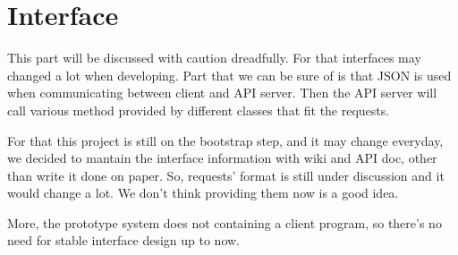 \section{Interface}
  This part will be discussed with caution dreadfully. For that interfaces may changed a lot when developing.
  Part that we can be sure of is that JSON is used when communicating between client and API server.
  Then the API server will call various method provided by different classes that fit the requests.

  For that this project is still on the bootstrap step, and it may change everyday, we decided to mantain the interface information with
  wiki and API doc, other than write it done on paper.
  So, requests' format is still under discussion and it would change a lot. We don't think providing them now is a good idea.

  More, the prototype system does not containing a client program, so there's no need for stable interface design up to now.

